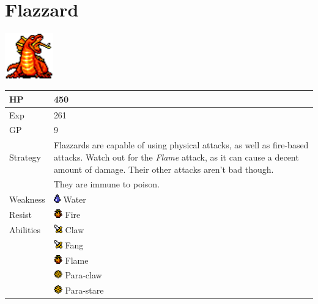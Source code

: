 \section{Flazzard}
\label{monster:flazzard}

\includegraphics[height=2cm,keepaspectratio]{./resources/monster/flazzard}

\begin{longtable}{ l p{9cm} }
	HP
	& 450
\\ \hline
	Exp
	& 261
\\ \hline
	GP
	& 9
\\ \hline
	Strategy
	& Flazzards are capable of using physical attacks, as well as fire-based attacks. Watch out for the \textit{Flame} attack, as it can cause a decent amount of damage. Their other attacks aren't bad though. \\
	& They are immune to poison.
\\ \hline
	Weakness
	& \includegraphics[height=1em,keepaspectratio]{./resources/effects/water} Water
\\ \hline
	Resist
	& \includegraphics[height=1em,keepaspectratio]{./resources/effects/fire} Fire
\\ \hline
	Abilities
	& \includegraphics[height=1em,keepaspectratio]{./resources/effects/damage} Claw \\
	& \includegraphics[height=1em,keepaspectratio]{./resources/effects/damage} Fang \\
	& \includegraphics[height=1em,keepaspectratio]{./resources/effects/fire} Flame \\
	& \includegraphics[height=1em,keepaspectratio]{./resources/effects/paralyze} Para-claw \\
	& \includegraphics[height=1em,keepaspectratio]{./resources/effects/paralyze} Para-stare
\end{longtable}
